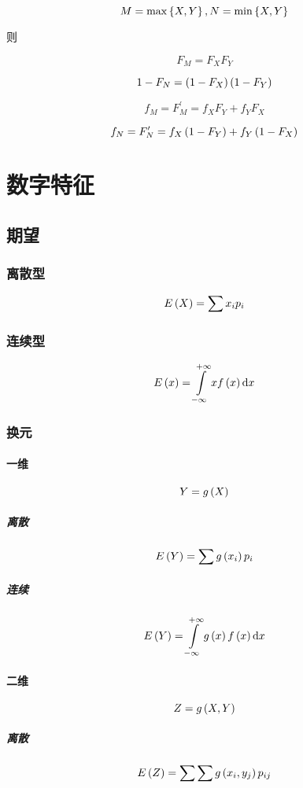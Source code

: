 \documentclass{article}
\begin{document}
\[M=\max\left\{X,Y\right\},N=\min\left\{X,Y\right\}\]

则

\[F_M=F_XF_Y\]

\[1-F_N=\left(1-F_X\right)\left(1-F_Y\right)\]

\[f_M=F^\prime_M=f_XF_Y+f_YF_X\]

\[f_N=F^\prime_N=f_X\left(1-F_Y\right)+f_Y\left(1-F_X\right)\]

\section{数字特征}

\subsection{期望}

\subsubsection{离散型}

\[E\left(X\right)=\sum x_ip_i\]

\subsubsection{连续型}

\[E\left(x\right)=\int\limits_{-\infty}^{+\infty} xf\left(x\right)\mathrm d x\]

\subsubsection{换元}

\paragraph{一维}

\[Y=g\left(X\right)\]

\subparagraph{离散}

\[E\left(Y\right)=\sum g\left(x_i\right)p_i\]

\subparagraph{连续}

\[E\left(Y\right)=\int\limits_{-\infty}^{+\infty} g\left(x\right)f\left(x\right)\mathrm d x\]

\paragraph{二维}

\[Z=g\left(X,Y\right)\]

\subparagraph{离散}

\[E\left(Z\right)=\sum\sum g\left(x_i,y_j\right)p_{ij}\]
\end{document}
